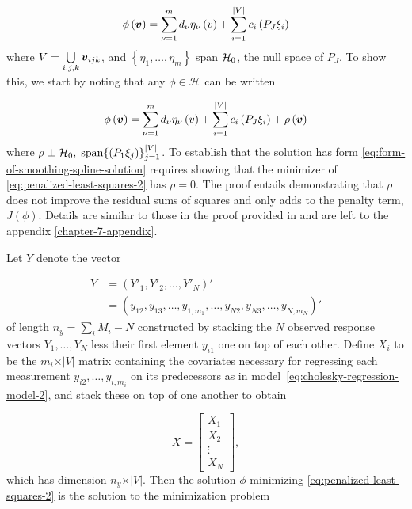 \begin{equation} \label{eq:form-of-smoothing-spline-solution}
\phi\left( \mbox{\boldmath $v$} \right) = \sum_{\nu=1}^{m} d_\nu \eta_\nu \left( v \right) + \sum_{i = 1}^{\vert V \vert} c_{i}\left(P_J \xi_i \right)
\end{equation}
\noindent
where $V = \bigcup\limits_{i,j,k} \mbox{\boldmath $v$}_{ijk}$, and $\left\{\eta_1,\dots, \eta_{m}\right\}$ span $\mathcal{H}_0$, the null space of $P_J$. To show this, we start by noting that any $\phi \in \mathcal{H}$ can be written 

\begin{equation} \label{eq:smoothing-spline-representer-expansion-1}
\phi\left( \mbox{\boldmath $v$} \right) = \sum_{\nu=1}^{m} d_\nu \eta_\nu \left( v \right) + \sum_{i = 1}^{\vert V \vert} c_{i}\left(P_J \xi_i \right) + \rho\left(\mbox{\boldmath $v$}\right)
\end{equation}
\noindent
where $\rho \perp \mathcal{H}_0,\; \textup{span}\lbrace \left(P_1 \xi_{j} \right) \rbrace_{j = 1}^{\vert V\vert}$. To establish that the solution has form \ref{eq:form-of-smoothing-spline-solution} requires showing that the minimizer of \ref{eq:penalized-least-squares-2} has $\rho = 0$. The proof entails demonstrating that $\rho$ does not improve the residual sums of squares and only adds to the penalty term, $J\left(\phi\right)$. Details are similar to those in the proof provided in \citet{wahba1990spline} and are left to the appendix \ref{chapter-7-appendix}.

\bigskip
\noindent
Let $Y$ denote the vector 

\begin{align}
Y &= \left( Y'_1, Y'_2, \dots, Y'_{N} \right)'\\
 &= \left( y_{12}, y_{13},\dots, y_{1,m_1}, \dots, y_{N2}, y_{N3},\dots, y_{N,m_N} \right)'
\end{align}
\noindent
of length $n_y= \sum_{i} M_i - N$  constructed by stacking the $N$ observed response vectors $Y_1,\dots, Y_N$ less their first element $y_{i1}$ one on top of each other. Define $X_i$ to be the $m_i \times \vert V \vert$ matrix containing the covariates necessary for regressing each measurement $y_{i2}, \dots, y_{i,m_i}$ on its predecessors as in model~\ref{eq:cholesky-regression-model-2}, and stack these on top of one another to obtain

\begin{equation} \label{eq:ar-design-matrix-1}
X = \begin{bmatrix}
X_1 \\
X_2\\
\vdots \\
X_N
\end{bmatrix},
\end{equation}
\noindent
which has dimension $n_y \times \vert V \vert$. Then the solution $\phi$  minimizing \ref{eq:penalized-least-squares-2}  is the solution to the minimization problem

